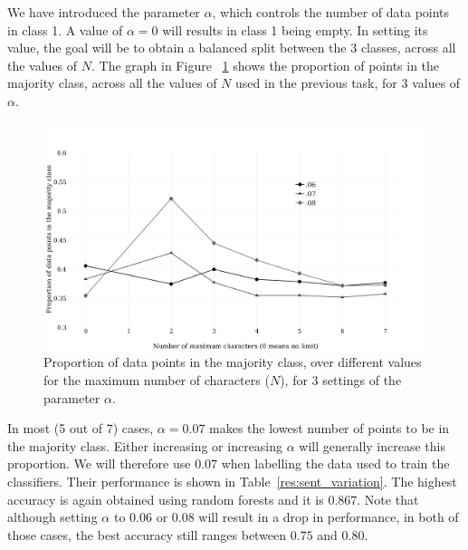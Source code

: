 \documentclass[bsc,frontabs,singlespacing,parskip, twoside]{infthesis}
\begin{document}
We have introduced the parameter $\alpha$, which controls the number of data points in class 1. A value of $\alpha=0$ will results in class 1 being empty. In setting its value, the goal will be to obtain a balanced split between the 3 classes, across all the values of $N$. The graph in Figure ~\ref{fig:alpha} shows the proportion of points in the majority class, across all the values of $N$ used in the previous task, for 3 values of $\alpha$.

\begin{figure}[h!]
\begin{adjustwidth}{-0.7in}{-0.7in}
	\centering
	\includegraphics[scale=0.55]{figures/variation_alpha2}
	\caption{Proportion of data points in the majority class, over different values for the maximum number of characters ($N$), for 3 settings of the parameter $\alpha$.}
\label{fig:alpha}
\end{adjustwidth}
\end{figure}

In most (5 out of 7) cases, $\alpha=0.07$ makes the lowest number of points to be in the majority class. Either increasing or increasing $\alpha$ will generally increase this proportion. We will therefore use $0.07$ when labelling the data used to train the classifiers. Their performance is shown in Table~\ref{res:sent_variation}. The highest accuracy is again obtained using random forests and it is $0.867$. Note that although setting $\alpha$ to $0.06$ or $0.08$ will result in a drop in performance,  in both of those cases, the best accuracy still ranges between $0.75$ and $0.80$.
\end{document}
